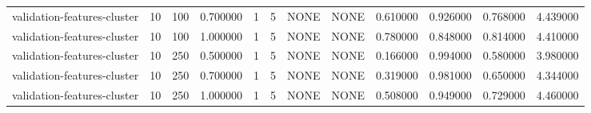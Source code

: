 \begin{tabular}{lrrrllllrrrr}
validation-features-cluster & 10 & 100 & 0.700000 & 1 & 5 & NONE & NONE & 0.610000 & 0.926000 & 0.768000 & 4.439000 \\
validation-features-cluster & 10 & 100 & 1.000000 & 1 & 5 & NONE & NONE & 0.780000 & 0.848000 & 0.814000 & 4.410000 \\
validation-features-cluster & 10 & 250 & 0.500000 & 1 & 5 & NONE & NONE & 0.166000 & 0.994000 & 0.580000 & 3.980000 \\
validation-features-cluster & 10 & 250 & 0.700000 & 1 & 5 & NONE & NONE & 0.319000 & 0.981000 & 0.650000 & 4.344000 \\
validation-features-cluster & 10 & 250 & 1.000000 & 1 & 5 & NONE & NONE & 0.508000 & 0.949000 & 0.729000 & 4.460000 \\
\bottomrule
\end{tabular}

